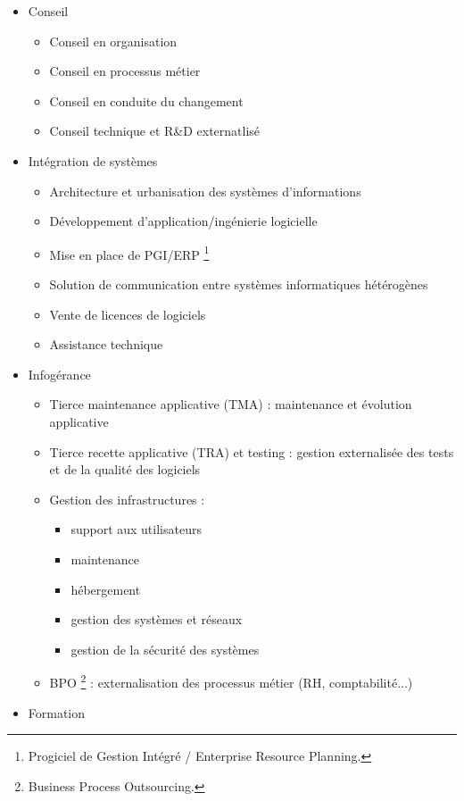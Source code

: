 \documentclass{article}
\begin{document}
\begin{itemize}
  \item[\ding{51}] Conseil
    \begin{itemize}
      \item Conseil en organisation
      \item Conseil en processus métier
      \item Conseil en conduite du changement
      \item Conseil technique et R{\&}D externatlisé
    \end{itemize}
  \item[\ding{51}] Intégration de systèmes
    \begin{itemize}
      \item Architecture et urbanisation des systèmes d'informations
      \item Développement d'application/ingénierie logicielle
      \item Mise en place de PGI/ERP \footnote{Progiciel de Gestion Intégré / Enterprise Resource Planning.}
      \item Solution de communication entre systèmes informatiques hétérogènes
      \item Vente de licences de logiciels
      \item Assistance technique
    \end{itemize}
  \item[\ding{51}] Infogérance
    \begin{itemize}
      \item Tierce maintenance applicative (TMA) : maintenance et évolution applicative
      \item Tierce recette applicative (TRA) et testing : gestion externalisée des tests et de la qualité des logiciels
      \item Gestion des infrastructures :
        \begin{itemize}
          \item[\ding{219}] support aux utilisateurs
          \item[\ding{219}] maintenance
          \item[\ding{219}] hébergement
          \item[\ding{219}] gestion des systèmes et réseaux
          \item[\ding{219}] gestion de la sécurité des systèmes
        \end{itemize}
      \item BPO \footnote{Business Process Outsourcing.} : externalisation des processus métier (RH, comptabilité...)
    \end{itemize}
  \item[\ding{51}] Formation
\end{itemize}
\end{document}
